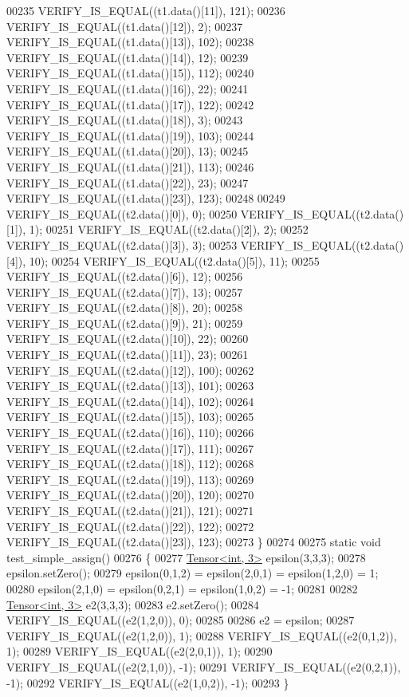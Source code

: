 \begin{DoxyCode}
00235   VERIFY\_IS\_EQUAL((t1.data()[11]), 121);
00236   VERIFY\_IS\_EQUAL((t1.data()[12]),   2);
00237   VERIFY\_IS\_EQUAL((t1.data()[13]), 102);
00238   VERIFY\_IS\_EQUAL((t1.data()[14]),  12);
00239   VERIFY\_IS\_EQUAL((t1.data()[15]), 112);
00240   VERIFY\_IS\_EQUAL((t1.data()[16]),  22);
00241   VERIFY\_IS\_EQUAL((t1.data()[17]), 122);
00242   VERIFY\_IS\_EQUAL((t1.data()[18]),   3);
00243   VERIFY\_IS\_EQUAL((t1.data()[19]), 103);
00244   VERIFY\_IS\_EQUAL((t1.data()[20]),  13);
00245   VERIFY\_IS\_EQUAL((t1.data()[21]), 113);
00246   VERIFY\_IS\_EQUAL((t1.data()[22]),  23);
00247   VERIFY\_IS\_EQUAL((t1.data()[23]), 123);
00248 
00249   VERIFY\_IS\_EQUAL((t2.data()[0]),    0);
00250   VERIFY\_IS\_EQUAL((t2.data()[1]),    1);
00251   VERIFY\_IS\_EQUAL((t2.data()[2]),    2);
00252   VERIFY\_IS\_EQUAL((t2.data()[3]),    3);
00253   VERIFY\_IS\_EQUAL((t2.data()[4]),   10);
00254   VERIFY\_IS\_EQUAL((t2.data()[5]),   11);
00255   VERIFY\_IS\_EQUAL((t2.data()[6]),   12);
00256   VERIFY\_IS\_EQUAL((t2.data()[7]),   13);
00257   VERIFY\_IS\_EQUAL((t2.data()[8]),   20);
00258   VERIFY\_IS\_EQUAL((t2.data()[9]),   21);
00259   VERIFY\_IS\_EQUAL((t2.data()[10]),  22);
00260   VERIFY\_IS\_EQUAL((t2.data()[11]),  23);
00261   VERIFY\_IS\_EQUAL((t2.data()[12]), 100);
00262   VERIFY\_IS\_EQUAL((t2.data()[13]), 101);
00263   VERIFY\_IS\_EQUAL((t2.data()[14]), 102);
00264   VERIFY\_IS\_EQUAL((t2.data()[15]), 103);
00265   VERIFY\_IS\_EQUAL((t2.data()[16]), 110);
00266   VERIFY\_IS\_EQUAL((t2.data()[17]), 111);
00267   VERIFY\_IS\_EQUAL((t2.data()[18]), 112);
00268   VERIFY\_IS\_EQUAL((t2.data()[19]), 113);
00269   VERIFY\_IS\_EQUAL((t2.data()[20]), 120);
00270   VERIFY\_IS\_EQUAL((t2.data()[21]), 121);
00271   VERIFY\_IS\_EQUAL((t2.data()[22]), 122);
00272   VERIFY\_IS\_EQUAL((t2.data()[23]), 123);
00273 \}
00274 
00275 \textcolor{keyword}{static} \textcolor{keywordtype}{void} test\_simple\_assign()
00276 \{
00277   \hyperlink{class_eigen_1_1_tensor}{Tensor<int, 3>} epsilon(3,3,3);
00278   epsilon.setZero();
00279   epsilon(0,1,2) = epsilon(2,0,1) = epsilon(1,2,0) = 1;
00280   epsilon(2,1,0) = epsilon(0,2,1) = epsilon(1,0,2) = -1;
00281 
00282   \hyperlink{class_eigen_1_1_tensor}{Tensor<int, 3>} e2(3,3,3);
00283   e2.setZero();
00284   VERIFY\_IS\_EQUAL((e2(1,2,0)), 0);
00285 
00286   e2 = epsilon;
00287   VERIFY\_IS\_EQUAL((e2(1,2,0)), 1);
00288   VERIFY\_IS\_EQUAL((e2(0,1,2)), 1);
00289   VERIFY\_IS\_EQUAL((e2(2,0,1)), 1);
00290   VERIFY\_IS\_EQUAL((e2(2,1,0)), -1);
00291   VERIFY\_IS\_EQUAL((e2(0,2,1)), -1);
00292   VERIFY\_IS\_EQUAL((e2(1,0,2)), -1);
00293 \}

\end{DoxyCode}

